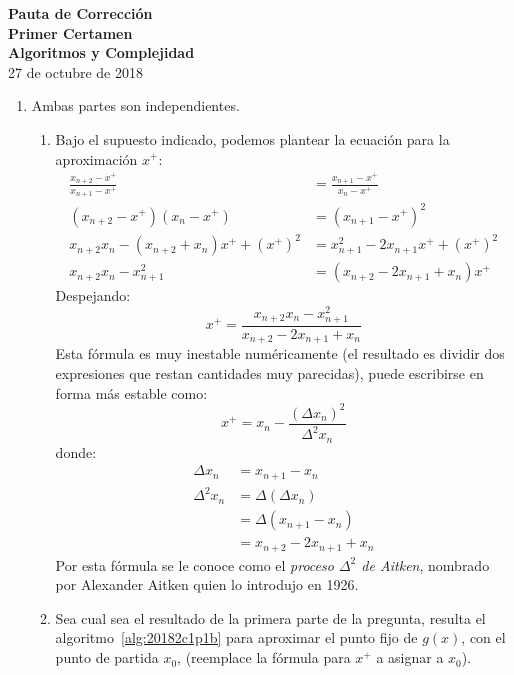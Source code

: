 \documentclass[english, spanish, fleqn]{article}
\begin{document}
\thispagestyle{empty}
  \begin{center}
    {\huge\textbf{Pauta de Corrección\\[0.4\baselineskip]
		  Primer Certamen\\[0.3\baselineskip]
		  Algoritmos y Complejidad}}\\
    \vspace{2ex}
    {\large 27 de octubre de 2018}
  \end{center}
  \vspace{5mm}

  \begin{enumerate}
  \item %
    Ambas partes son independientes.
    \begin{enumerate}
    \item %
      Bajo el supuesto indicado,
      podemos plantear la ecuación para la aproximación \(x^+\):
      \begin{align*}
	\frac{x_{n + 2} - x^+}{x_{n + 1} - x^+}
	  &= \frac{x_{n + 1} - x^+}{x_n - x^+} \\
	(x_{n + 2} - x^+) (x_n - x^+)
	  &= (x_{n + 1} - x^+)^2 \\
	x_{n + 2} x_n - (x_{n + 2} + x_n) x^+ + (x^+)^2
	  &= x_{n + 1}^2 - 2 x_{n + 1} x^+ + (x^+)^2 \\
	x_{n + 2} x_n - x_{n + 1}^2
	  &= (x_{n + 2} - 2 x_{n + 1} + x_n) x^+
      \end{align*}
      Despejando:
      \begin{equation*}
	x^+
	  = \frac{x_{n + 2} x_n - x_{n + 1}^2}{x_{n + 2} - 2 x_{n + 1} + x_n}
      \end{equation*}
      Esta fórmula es muy inestable numéricamente
      (el resultado es dividir dos expresiones
       que restan cantidades muy parecidas),
      puede escribirse en forma más estable como:
      \begin{equation*}
	x^+
	  = x_n - \frac{(\Delta x_n)^2}{\Delta^2 x_n}
      \end{equation*}
      donde:
      \begin{align*}
	\Delta x_n
	  &= x_{n + 1} - x_n \\
	\Delta^2 x_n
	  &= \Delta (\Delta x_n) \\
	  &= \Delta (x_{n + 1} - x_n) \\
	  &= x_{n + 2} - 2 x_{n + 1} + x_n
      \end{align*}
      Por esta fórmula
      se le conoce como el \emph{proceso \(\Delta^2\) de Aitken},
      nombrado
      por Alexander Aitken quien lo introdujo en 1926.
    \item %
      Sea cual sea el resultado de la primera parte de la pregunta,
      resulta el algoritmo~\ref{alg:20182c1p1b}
      para aproximar el punto fijo de \(g(x)\),
      con el punto de partida \(x_0\),
      (reemplace la fórmula para \(x^+\)
       a asignar a \(x_0\)).
      \begin{algorithm}
	\DontPrintSemicolon


\end{algorithm}
\end{enumerate}
\end{enumerate}
\end{document}

